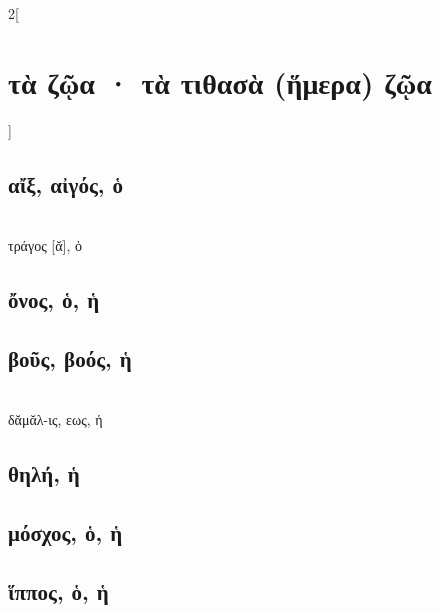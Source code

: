 \documentclass{book}
\begin{document}
\begin{multicols}{2}[\section{τὰ ζῷα · τὰ τιθασὰ (ἥμερα) ζῷα}]
\subsection{αἴξ, αἰγός, ὁ}
 ~\\
τράγος [ᾰ], ὁ
\subsection{ὄνος, ὁ, ἡ}
\subsection{βοῦς, βοός, ἡ}
 ~\\
δᾰμᾰλ-ις, εως, ἡ 
\subsection{θηλή, ἡ}
\subsection{μόσχος, ὁ, ἡ}
\subsection{ἵππος, ὁ, ἡ}
~
\end{multicols}
\newpage  
\end{document}

